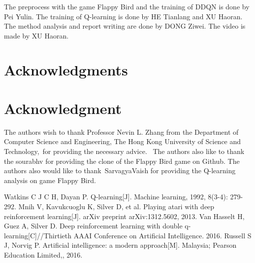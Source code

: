 \documentclass[conference,compsoc]{IEEEtran}
\begin{document}
The preprocess with the game Flappy Bird and the training of DDQN is done by Pei Yulin. The training of Q-learning is done by HE Tianlang and XU Haoran. The method analysis and report writing are done by DONG Ziwei. The video is made by  XU Haoran.

\indent 

\indent 
\ifCLASSOPTIONcompsoc
  \section*{Acknowledgments}
\else
  \section*{Acknowledgment}
\fi

The authors wish to thank Professor Nevin L. Zhang from the Department of  Computer Science and Engineering, The Hong Kong University of Science and Technology, for providing the necessary advice.  The authors also like to thank the sourabhv for providing the clone of the Flappy Bird game on Github. The authors also would like to thank SarvagyaVaish for providing the Q-learning analysis on game Flappy Bird.
  


\begin{thebibliography}{1}

Watkins C J C H, Dayan P. Q-learning[J]. Machine learning, 1992, 8(3-4): 279-292.
Mnih V, Kavukcuoglu K, Silver D, et al. Playing atari with deep reinforcement learning[J]. arXiv preprint arXiv:1312.5602, 2013.
Van Hasselt H, Guez A, Silver D. Deep reinforcement learning with double q-learning[C]//Thirtieth AAAI Conference on Artificial Intelligence. 2016.
Russell S J, Norvig P. Artificial intelligence: a modern approach[M]. Malaysia; Pearson Education Limited,, 2016.

\end{thebibliography}




\end{document}
